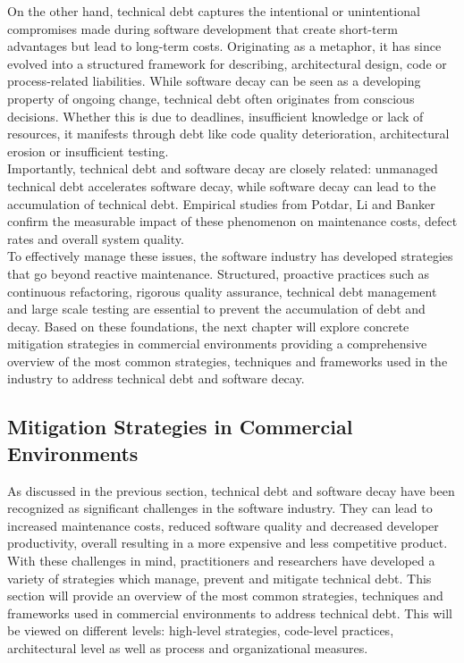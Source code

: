 On the other hand, technical debt captures the intentional or unintentional compromises made during software development that create short-term advantages but lead to long-term costs. Originating as a metaphor, it has since evolved into a structured framework for describing, architectural design, code or process-related liabilities.
While software decay can be seen as a developing property of ongoing change, technical debt often originates from conscious decisions. Whether this is due to deadlines, insufficient knowledge or lack of resources, it manifests through debt like code quality deterioration, architectural erosion or insufficient testing.\\

Importantly, technical debt and software decay are closely related: unmanaged technical debt accelerates software decay, while software decay can lead to the accumulation of technical debt. Empirical studies from Potdar, Li and Banker confirm the measurable impact of these phenomenon on maintenance costs, defect rates and overall system quality.\\

To effectively manage these issues, the software industry has developed strategies that go beyond reactive maintenance. Structured, proactive practices such as continuous refactoring, rigorous quality assurance, technical debt management and large scale testing are essential to prevent the accumulation of debt and decay.
Based on these foundations, the next chapter will explore concrete mitigation strategies in commercial environments providing a comprehensive overview of the most common strategies, techniques and frameworks used in the industry to address technical debt and software decay.\\

\subsection{Mitigation Strategies in Commercial Environments}
As discussed in the previous section, technical debt and software decay have been recognized as significant challenges in the software industry. They can lead to 
increased maintenance costs, reduced software quality and decreased developer productivity, overall resulting in a more expensive and less competitive product.
With these challenges in mind, practitioners and researchers have developed a variety of strategies which manage, prevent and mitigate technical debt.
This section will provide an overview of the most common strategies, techniques and frameworks used in commercial environments to address technical debt.
This will be viewed on different levels: high-level strategies, code-level practices, architectural level as well as process and organizational measures.\\

